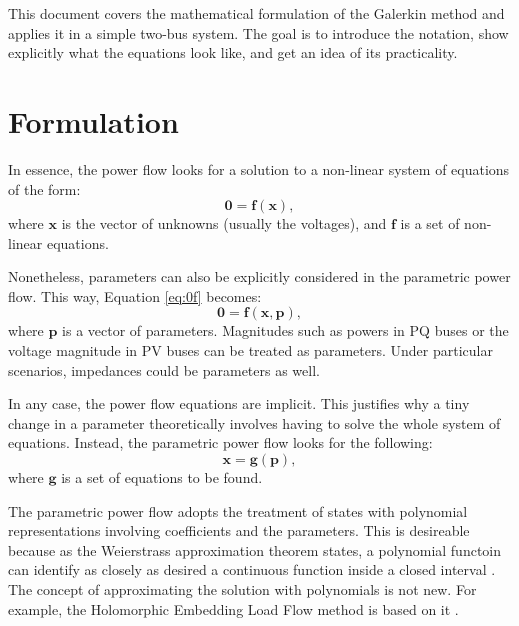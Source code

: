 This document covers the mathematical formulation of the Galerkin method and applies it in a simple two-bus system. The goal is to introduce the notation, show explicitly what the equations look like, and get an idea of its practicality. 

\section{Formulation}
In essence, the power flow looks for a solution to a non-linear system of equations of the form:
\begin{equation}
   \bm{0} = \bm{f}(\bm{x}),
   \label{eq:0f}
\end{equation}
where $\bm{x}$ is the vector of unknowns (usually the voltages), and $\bm{f}$ is a set of non-linear equations.

Nonetheless, parameters can also be explicitly considered in the parametric power flow. This way, Equation \ref{eq:0f} becomes:
\begin{equation}
   \bm{0} = \bm{f}(\bm{x}, \bm{p}),
\end{equation}
where $\bm{p}$ is a vector of parameters. Magnitudes such as powers in PQ buses or the voltage magnitude in PV buses can be treated as parameters. Under particular scenarios, impedances could be parameters as well.

In any case, the power flow equations are implicit. This justifies why a tiny change in a parameter theoretically involves having to solve the whole system of equations. Instead, the parametric power flow looks for the following:
\begin{equation}
   \bm{x} = \bm{g}(\bm{p}),
\end{equation}
where $\bm{g}$ is a set of equations to be found. 

The parametric power flow adopts the treatment of states with polynomial representations involving coefficients and the parameters. This is desireable because as the Weierstrass approximation theorem states, a polynomial functoin can identify as closely as desired a continuous function inside a closed interval \cite{trefethen2019approximation, wu2020parametric}. The concept of approximating the solution with polynomials is not new. For example, the Holomorphic Embedding Load Flow method is based on it \cite{trias2012holomorphic}. 

